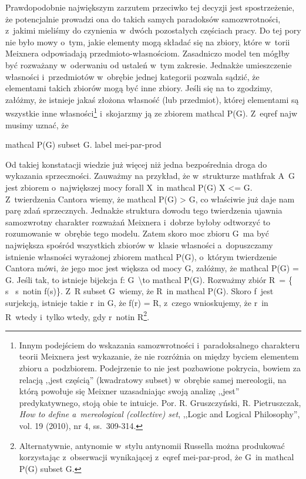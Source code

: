 Prawdopodobnie największym zarzutem przeciwko tej decyzji jest spostrzeżenie, że potencjalnie prowadzi ona do takich samych paradoksów samozwrotności, z~jakimi mieliśmy do czynienia w~dwóch pozostałych częściach pracy. Do tej pory nie było mowy o~tym, jakie elementy mogą składać się na zbiory, które w~torii Meixnera odpowiadają przedmioto-własnościom. Zasadniczo model ten mógłby być rozważany w~oderwaniu od ustaleń w~tym zakresie. Jednakże umieszczenie własności i~przedmiotów w~obrębie jednej kategorii pozwala sądzić, że elementami takich zbiorów mogą być inne zbiory. Jeśli się na to zgodzimy, załóżmy, że istnieje jakaś złożona własność (lub przedmiot), której elementami są wszystkie inne własności\footnote{ Innym podejściem do wskazania samozwrotności i~paradoksalnego charakteru teorii Meixnera jest wykazanie, że nie rozróżnia on między byciem elementem zbioru a~podzbiorem. Podejrzenie to nie jest pozbawione pokrycia, bowiem za relacją ,,jest częścią'' (kwadratowy subset) w~obrębie samej mereologii, na którą powołuje się Meixner uzasadniając swoją analizę ,,jest'' predykatywnego, stoją obie te intuicje. Por. R. Gruszczyński, R. Pietruszczak, \textit{How to define a~mereological (collective) set}, ,,Logic and Logical Philosophy'', vol. 19 (2010), nr 4, ss.~309-314.} i~skojarzmy ją ze zbiorem mathcal P(G). Z~eqref najw musimy uznać, że

mathcal P(G) subset G. label mei-par-prod

Od takiej konstatacji wiedzie już więcej niż jedna bezpośrednia droga do wykazania sprzeczności. Zauważmy na przykład, że w~strukturze mathfrak A~G jest zbiorem o~największej mocy forall X~in mathcal P(G) {\textbar}X{\textbar} {\textless}= {\textbar}G{\textbar}. Z~twierdzenia Cantora wiemy, że {\textbar}mathcal P(G){\textbar} {\textgreater} {\textbar}G{\textbar}, co właściwie już daje nam parę zdań sprzecznych. Jednakże struktura dowodu tego twierdzenia ujawnia samozwrotny charakter rozważań Meixnera i~dobrze byłoby odtworzyć to rozumowanie w~obrębie tego modelu. Zatem skoro moc zbioru G~ma być największa spośród wszystkich zbiorów w~klasie własności a~dopuszczamy istnienie własności wyrażonej zbiorem mathcal P(G), o~którym twierdzenie Cantora mówi, że jego moc jest większa od mocy G, załóżmy, że {\textbar}mathcal P(G){\textbar} = {\textbar}G{\textbar}. Jeśli tak, to istnieje bijekcja f: G~{\textbackslash}to mathcal P(G). Rozważmy zbiór R~= \{ s~{\textbar} s~notin f(s)\}. Z~R subset G~wiemy, że R~in mathcal P(G). Skoro f~jest surjekcją, istnieje takie r~in G, że f(r) = R, z~czego wnioskujemy, że r~in R~wtedy i~tylko wtedy, gdy r~notin R\footnote{ Alternatywnie, antynomie w~stylu antynomii Russella można produkować korzystając z~obserwacji wynikającej z~eqref mei-par-prod, że G~in mathcal P(G) subset G.}.

